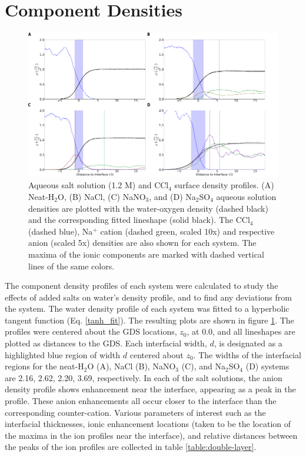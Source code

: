 \section{Component Densities}

\begin{figure}[h!]
\begin{center}
	\includegraphics[scale=1.0]{images/densities.png}
	\caption{Aqueous salt solution (1.2 M) and CCl$_4$ surface density profiles. (A) Neat-H$_2$O, (B) NaCl, (C) NaNO$_3$, and (D) Na$_2$SO$_4$ aqueous solution densities are plotted with the water-oxygen density (dashed black) and the corresponding fitted lineshape (solid black). The CCl$_4$ (dashed blue), Na$^+$ cation (dashed green, scaled 10x) and respective anion (scaled 5x) densities are also shown for each system. The maxima of the ionic components are marked with dashed vertical lines of the same colors.}
	\label{fig:density-plots}
\end{center}
\end{figure}

The component density profiles of each system were calculated to study the effects of added salts on water's density profile, and to find any deviations from the \ctcwat system. The water density profile of each system was fitted to a hyperbolic tangent function (Eq. \ref{tanh_fit}). The resulting plots are shown in figure \ref{fig:density-plots}. The profiles were centered about the GDS locations, $z_0$, at 0.0\angs, and all lineshapes are plotted as distances to the GDS. Each interfacial width, $d$, is designated as a highlighted blue region of width $d$ centered about $z_0$.  The widths of the interfacial regions for the neat-H$_2$O (A), NaCl (B), NaNO$_3$ (C), and Na$_2$SO$_4$ (D) systems are 2.16, 2.62, 2.20, 3.69\angs, respectively. In each of the salt solutions, the anion density profile shows enhancement near the interface, appearing as a peak in the profile. These anion enhancements all occur closer to the interface than the corresponding counter-cation. Various parameters of interest such as the interfacial thicknesses, ionic enhancement locations (taken to be the location of the maxima in the ion profiles near the interface), and relative distances between the peaks of the ion profiles are collected in table \ref{table:double-layer}.

